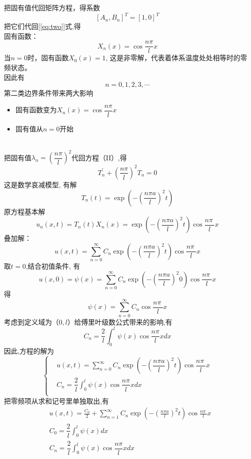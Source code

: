 	把固有值代回矩阵方程，得系数 $$ [A_n, B_n] ^T =[1, 0] ^T$$
	把它们代回[\ref{eq:two}]式,得 \\
	固有函数：
	\begin{equation*}
		X_n (x)=\cos \frac{n\pi}{l} x
	\end{equation*}
	当$n=0$时，固有函数$X_0 (x)=1$, 这是非零解，代表着体系温度处处相等时的零频状态。\\
	因此有
	\[ n=0, 1, 2, 3, \cdots \]
	第二类边界条件带来两大影响
  \begin{itemize}
	\item 固有函数变为$X_n (x)=\cos \dfrac{n\pi}{l} x$  
	\item 固有值从$n=0$开始
  \end{itemize}
	
  ~~\\ 
  把固有值$\lambda_n =(\dfrac{n\pi}{l})^2 $代回方程（II）,得
	\begin{equation*}
		T_n^{'} +(\dfrac{n\pi}{l})^2 T_n=0 
	\end{equation*}
	这是数学哀减模型,
	有解 
	$$
	T_n (t)=  \exp(-(\frac{n\pi a}{l})^2 t)
	$$ 
	原方程基本解
	$$
	u_n(x,t)= T_n (t) X_n (x)=  \exp(-(\frac{n\pi a}{l})^2 t) \cos \frac{n\pi~}{l} x
	$$ 
	叠加解：
	\begin{equation*}
		u(x,t)=\sum\limits_{n=0}^{\infty } C_n  \exp(-(\frac{n\pi a}{l})^2 t) \cos \frac{n\pi~}{l} x
	\end{equation*}
	取$t=0$,结合初值条件, 有
    $$
	u(x,0) =\psi(x) =  \sum\limits_{n=0}^{\infty } C_n  \exp(-(\frac{n\pi a}{l})^2 0) \cos \frac{n\pi~}{l} x
	$$ 
	得
	$$
	\psi(x) =  \sum\limits_{n=0}^{\infty } C_n \cos \frac{n\pi~}{l} x
	$$ 
	考虑到定义域为（$0,l$）给傅里叶级数公式带来的影响,有
	$$
	C_n = \dfrac{2}{l} \int_{0}^{l} \psi(x) \cos \dfrac{n\pi}{l} xdx
	$$
	因此,方程的解为
	$$ \left\{
	\begin{aligned}
				&u(x,t)=\sum\limits_{n=0}^{\infty } C_n  \exp(-(\dfrac{n\pi a}{l})^2 t) \cos \dfrac{n\pi~}{l} x \\
				&C_n = \dfrac{2}{l} \int_{0}^{l} \psi(x) \cos \dfrac{n\pi}{l} xdx \\ 
	\end{aligned} \right.
	$$ 
	把零频项从求和记号里单独取出,有
	$$
	\boxed{\begin{aligned}
			& u(x,t)=\frac{C_0}{2} + \sum\limits_{n=1}^{\infty } C_n \exp(-(\frac{n\pi a}{l})^2 t) \cos \frac{n\pi~}{l} x \\
			& C_0 = \dfrac{2}{l} \int_{0}^{l} \psi(x) dx \\
			& C_n = \dfrac{2}{l} \int_{0}^{l} \psi(x) \cos \dfrac{n\pi}{l} xdx 
		\end{aligned}}  
	$$ 
